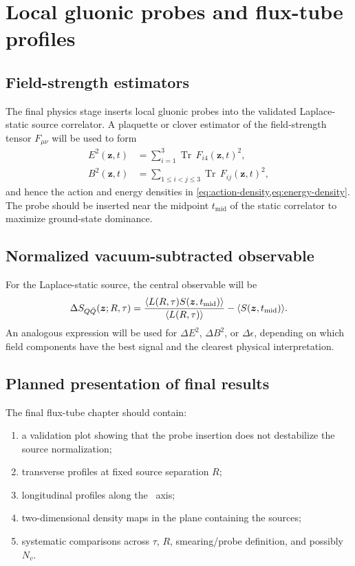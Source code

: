\chapter{Local gluonic probes and flux-tube profiles}
\label{chap:flux-tube}

\section{Field-strength estimators}
The final physics stage inserts local gluonic probes into the validated Laplace-static source correlator. A plaquette or clover estimator of the field-strength tensor \(F_{\mu\nu}\) will be used to form
\begin{align}
  E^2(\bm z,t) &= \sum_{i=1}^{3}\operatorname{Tr}\,F_{i4}(\bm z,t)^2, \\
  B^2(\bm z,t) &= \sum_{1\leq i<j\leq 3}\operatorname{Tr}\,F_{ij}(\bm z,t)^2,
\end{align}
and hence the action and energy densities in \cref{eq:action-density,eq:energy-density}. The probe should be inserted near the midpoint \(t_{\mathrm{mid}}\) of the static correlator to maximize ground-state dominance.

\section{Normalized vacuum-subtracted observable}
For the Laplace-static source, the central observable will be
\begin{equation}
  \Delta S_{Q\bar Q}(\bm z;R,\tau)=
  \frac{\langle L(R,\tau) S(\bm z,t_{\mathrm{mid}})\rangle}{\langle L(R,\tau)\rangle}
  -\langle S(\bm z,t_{\mathrm{mid}})\rangle.
  \label{eq:laplace-local-probe-ratio}
\end{equation}
An analogous expression will be used for \(\Delta E^2\), \(\Delta B^2\), or \(\Delta\epsilon\), depending on which field components have the best signal and the clearest physical interpretation.

\section{Planned presentation of final results}
The final flux-tube chapter should contain:
\begin{enumerate}
  \item a validation plot showing that the probe insertion does not destabilize the source normalization;
  \item transverse profiles at fixed source separation \(R\);
  \item longitudinal profiles along the \QQbar\ axis;
  \item two-dimensional density maps in the plane containing the sources;
  \item systematic comparisons across \(\tau\), \(R\), smearing/probe definition, and possibly \(N_v\).
\end{enumerate}

